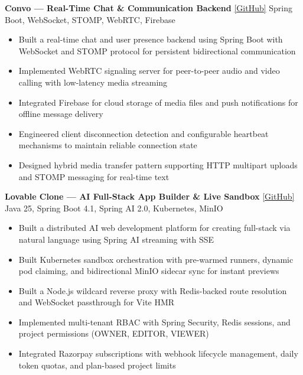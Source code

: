 \documentclass[a4paper,10pt]{article}
\begin{document}
\vspace{0.5em}
{\small\color{bodyText}
\textbf{Convo --- Real-Time Chat \& Communication Backend} \href{https://github.com/ubinox-pi/Convo}{\textcolor{linkBlue}{[GitHub]}} \hfill {\footnotesize\textcolor{techGray}{Spring Boot, WebSocket, STOMP, WebRTC, Firebase}}
\begin{itemize}[leftmargin=1.2em, topsep=2pt, itemsep=0pt, parsep=0pt]
    \item Built a real-time chat and user presence backend using Spring Boot with WebSocket and STOMP protocol for persistent bidirectional communication
    \item Implemented WebRTC signaling server for peer-to-peer audio and video calling with low-latency media streaming
    \item Integrated Firebase for cloud storage of media files and push notifications for offline message delivery
    \item Engineered client disconnection detection and configurable heartbeat mechanisms to maintain reliable connection state
    \item Designed hybrid media transfer pattern supporting HTTP multipart uploads and STOMP messaging for real-time text
\end{itemize}
}

\vspace{0.5em}
{\small\color{bodyText}
\textbf{Lovable Clone --- AI Full-Stack App Builder \& Live Sandbox} \href{https://github.com/ubinox-pi/lovable}{\textcolor{linkBlue}{[GitHub]}} \hfill {\footnotesize\textcolor{techGray}{Java 25, Spring Boot 4.1, Spring AI 2.0, Kubernetes, MinIO}}
\begin{itemize}[leftmargin=1.2em, topsep=2pt, itemsep=0pt, parsep=0pt]
    \item Built a distributed AI web development platform for creating full-stack via natural language using Spring AI streaming with SSE
    \item Built Kubernetes sandbox orchestration with pre-warmed runners, dynamic pod claiming, and bidirectional MinIO sidecar sync for instant previews
    \item Built a Node.js wildcard reverse proxy with Redis-backed route resolution and WebSocket passthrough for Vite HMR
    \item Implemented multi-tenant RBAC with Spring Security, Redis sessions, and project permissions (OWNER, EDITOR, VIEWER)
    \item Integrated Razorpay subscriptions with webhook lifecycle management, daily token quotas, and plan-based project limits
\end{itemize}
}
\end{document}
